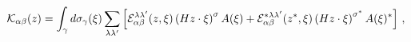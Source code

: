 \begin{equation}
{\cal K}_{\alpha\beta}(z)=\int_{\gamma}d\sigma_{\gamma}(\xi)
\sum_{\lambda\lambda'}\left[{\cal
E}_{\alpha\beta}^{\lambda\lambda'}(z,\xi) \left( Hz\cdot
\xi\right)^{\sigma}A(\xi)+{\cal
E}_{\alpha\beta}^{*\lambda\lambda'}(z^{*},\xi) \left( Hz\cdot
\xi\right)^{\sigma^{*}}A(\xi)^{*}\right]\,,
\end{equation}

